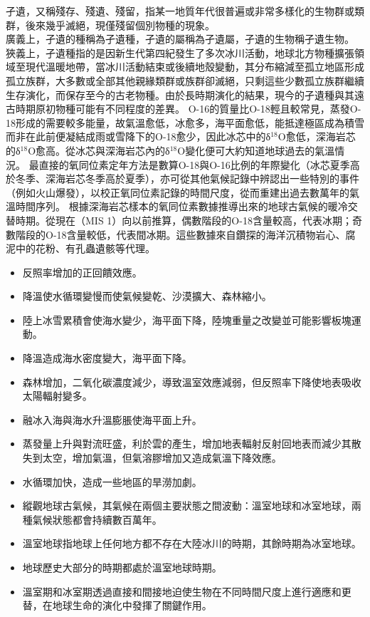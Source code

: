 \documentclass[a4paper,12pt]{report}
\begin{document}
孑遺，又稱殘存、殘遺、殘留，指某一地質年代很普遍或非常多樣化的生物群或類群，後來幾乎滅絕，現僅殘留個別物種的現象。\\
廣義上，孑遺的種稱為孑遺種，孑遺的屬稱為孑遺屬，孑遺的生物稱孑遺生物。\\
狹義上，孑遺種指的是因新生代第四紀發生了多次冰川活動，地球北方物種擴張領域至現代溫暖地帶，當冰川活動結束或後續地殼變動，其分布縮減至孤立地區形成孤立族群，大多數或全部其他親緣類群或族群卻滅絕，只剩這些少數孤立族群繼續生存演化，而保存至今的古老物種。由於長時期演化的結果，現今的孑遺種與其遠古時期原初物種可能有不同程度的差異。
O-16的質量比O-18輕且較常見，蒸發O-18形成的需要較多能量，故氣溫愈低，冰愈多，海平面愈低，能抵達極區成為積雪而非在此前便凝結成雨或雪降下的O-18愈少，因此冰芯中的δ$^{18}$O愈低，深海岩芯的δ$^{18}$O愈高。從冰芯與深海岩芯內的δ$^{18}$O變化便可大約知道地球過去的氣溫情況。
最直接的氧同位素定年方法是數算O-18與O-16比例的年際變化（冰芯夏季高於冬季、深海岩芯冬季高於夏季），亦可從其他氣候記錄中辨認出一些特別的事件（例如火山爆發），以校正氧同位素記錄的時間尺度，從而重建出過去數萬年的氣溫時間序列。
根據深海岩芯樣本的氧同位素數據推導出來的地球古氣候的暖冷交替時期。從現在（MIS 1）向以前推算，偶數階段的O-18含量較高，代表冰期；奇數階段的O-18含量較低，代表間冰期。這些數據來自鑽探的海洋沉積物岩心、腐泥中的花粉、有孔蟲遺骸等代理。
\begin{itemize}
\item 反照率增加的正回饋效應。
\item 降溫使水循環變慢而使氣候變乾、沙漠擴大、森林縮小。
\item 陸上冰雪累積會使海水變少，海平面下降，陸塊重量之改變並可能影響板塊運動。
\item 降溫造成海水密度變大，海平面下降。
\end{itemize}
\begin{itemize}
\item 森林增加，二氧化碳濃度減少，導致溫室效應減弱，但反照率下降使地表吸收太陽輻射變多。
\item 融冰入海與海水升溫膨脹使海平面上升。
\item 蒸發量上升與對流旺盛，利於雲的產生，增加地表輻射反射回地表而減少其散失到太空，增加氣溫，但氣溶膠增加又造成氣溫下降效應。
\item 水循環加快，造成一些地區的旱澇加劇。
\end{itemize}
\begin{itemize}
\item 縱觀地球古氣候，其氣候在兩個主要狀態之間波動：溫室地球和冰室地球，兩種氣候狀態都會持續數百萬年。
\item 溫室地球指地球上任何地方都不存在大陸冰川的時期，其餘時期為冰室地球。
\item 地球歷史大部分的時期都處於溫室地球時期。
\item 溫室期和冰室期透過直接和間接地迫使生物在不同時間尺度上進行適應和更替，在地球生命的演化中發揮了關鍵作用。
\end{itemize}
\end{document}
